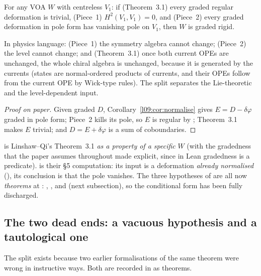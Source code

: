 \begin{theorem}\label{l09:thm:split}
For any VOA $W$ with centreless $V_1$: if (Theorem~3.1) every graded regular deformation is trivial,
(Piece~1) $H^2(V_1,V_1) = 0$, and (Piece~2) every graded deformation in pole form has vanishing pole
on $V_1$, then $W$ is graded rigid.
\end{theorem}
\begin{physics}
In physics language: (Piece~1) the symmetry algebra cannot change; (Piece~2) the level cannot change; and
(Theorem~3.1) once both current OPEs are unchanged, the whole chiral algebra is unchanged, because it is
generated by the currents (states are normal-ordered products of currents, and their OPEs follow from the
current OPE by Wick-type rules). The split separates the Lie-theoretic and the level-dependent input.
\end{physics}


\begin{proof}[Proof on paper]
Given graded $D$, Corollary~\ref{l09:cor:normalise} gives $E = D-\delta\varphi$ graded in pole form; Piece~2
kills its pole, so $E$ is regular by ; Theorem~3.1 makes $E$ trivial; and
$D = E + \delta\varphi$ is a sum of coboundaries.
\end{proof}

\begin{dictionary}
 is Linshaw--Qi's Theorem~3.1 \emph{as a property of a
specific} $W$ (with the gradedness that the paper assumes throughout made explicit, since in Lean
gradedness is a predicate).  is their \S5 computation: its input is a
deformation \emph{already normalised} (), its conclusion is that the pole
 vanishes. The three hypotheses of  are all now
\emph{theorems} at : , ,
and  (next subsection), so the conditional form has been fully
discharged.
\end{dictionary}

\subsection{The two dead ends: a vacuous hypothesis and a tautological one}\label{l09:sec:deadends}

The split exists because two earlier formalisations of the same theorem were wrong in instructive
ways. Both are recorded in  as theorems.

